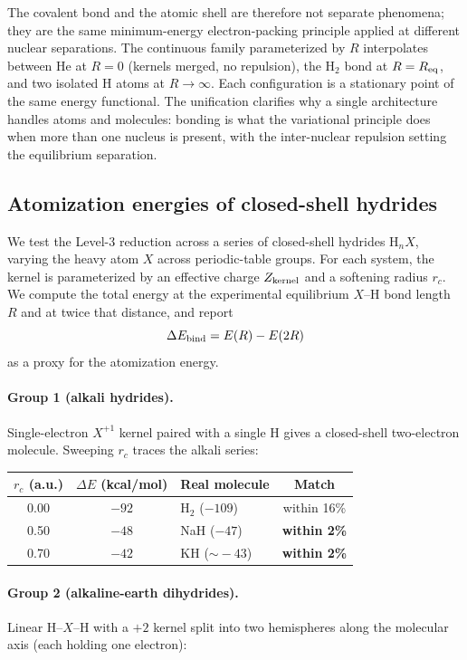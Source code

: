 \documentclass[11pt]{article}
\begin{document}
The covalent bond and the atomic shell are therefore not separate phenomena; they are the same minimum-energy electron-packing principle applied at different nuclear separations. The continuous family parameterized by $R$ interpolates between He at $R = 0$ (kernels merged, no repulsion), the H$_2$ bond at $R = R_{\rm eq}$, and two isolated H atoms at $R \to \infty$. Each configuration is a stationary point of the same energy functional. The unification clarifies why a single architecture handles atoms and molecules: bonding is what the variational principle does when more than one nucleus is present, with the inter-nuclear repulsion setting the equilibrium separation.

\subsection{Atomization energies of closed-shell hydrides}\label{sec:hydrides}

We test the Level-3 reduction across a series of closed-shell hydrides $\mathrm{H}_n X$, varying the heavy atom $X$ across periodic-table groups. For each system, the kernel is parameterized by an effective charge $Z_{\rm kernel}$ and a softening radius $r_c$. We compute the total energy at the experimental equilibrium $X$--H bond length $R$ and at twice that distance, and report
\[
\Delta E_{\rm bind} = E(R) - E(2R)
\]
as a proxy for the atomization energy.

\paragraph{Group 1 (alkali hydrides).}
Single-electron $X^{+1}$ kernel paired with a single H gives a closed-shell two-electron molecule. Sweeping $r_c$ traces the alkali series:

\begin{center}
\begin{tabular}{c c l c}
\toprule
$r_c$ (a.u.) & $\Delta E$ (kcal/mol) & Real molecule & Match \\
\midrule
0.00 & $-92$ & H$_2$ ($-109$) & within 16\% \\
0.50 & $-48$ & NaH ($-47$) & \textbf{within 2\%} \\
0.70 & $-42$ & KH ($\sim\!-43$) & \textbf{within 2\%} \\
\bottomrule
\end{tabular}
\end{center}

\paragraph{Group 2 (alkaline-earth dihydrides).}
Linear H--$X$--H with a $+2$ kernel split into two hemispheres along the molecular axis (each holding one electron):
\end{document}
